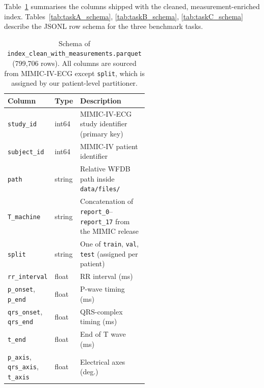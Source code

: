 \documentclass[12pt,letterpaper]{article}
\begin{document}
Table~\ref{tab:index_schema} summarises the columns shipped with the cleaned, measurement-enriched index. Tables~\ref{tab:taskA_schema}, \ref{tab:taskB_schema}, \ref{tab:taskC_schema} describe the JSONL row schema for the three benchmark tasks.

\begin{table}[!ht]
\centering
\caption{Schema of \texttt{index\_clean\_with\_measurements.parquet} (799{,}706 rows). All columns are sourced from MIMIC-IV-ECG except \texttt{split}, which is assigned by our patient-level partitioner.}
\label{tab:index_schema}
\renewcommand{\arraystretch}{1.2}
\begin{tabular}{@{}l l p{0.55\linewidth}@{}}
\toprule
Column & Type & Description \\
\midrule
\texttt{study\_id}    & int64  & MIMIC-IV-ECG study identifier (primary key) \\
\texttt{subject\_id}  & int64  & MIMIC-IV patient identifier \\
\texttt{path}         & string & Relative WFDB path inside \texttt{data/files/} \\
\texttt{T\_machine}   & string & Concatenation of \texttt{report\_0}--\texttt{report\_17} from the MIMIC release \\
\texttt{split}        & string & One of \texttt{train}, \texttt{val}, \texttt{test} (assigned per patient) \\
\texttt{rr\_interval} & float  & RR interval (ms) \\
\texttt{p\_onset}, \texttt{p\_end}     & float & P-wave timing (ms) \\
\texttt{qrs\_onset}, \texttt{qrs\_end} & float & QRS-complex timing (ms) \\
\texttt{t\_end}       & float  & End of T wave (ms) \\
\texttt{p\_axis}, \texttt{qrs\_axis}, \texttt{t\_axis} & float & Electrical axes (deg.) \\
\bottomrule
\end{tabular}
\end{table}
\end{document}
